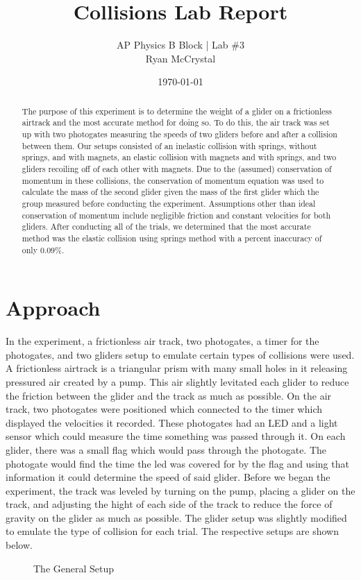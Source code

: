 \documentclass[12pt]{article}
\title{Collisions Lab Report}
\author{AP Physics B Block | Lab \#3\\Ryan McCrystal}
\date{\today}
\begin{document}
\maketitle
\newpage
\singlespacing
\tableofcontents
\doublespacing
\newpage

\begin{abstract}
	The purpose of this experiment is to determine the weight of a glider on a frictionless airtrack and the most accurate method for doing so. To do this, the air track was set up with two photogates measuring the speeds of two gliders before and after a collision between them. Our setups consisted of an inelastic collision with springs, without springs, and with magnets, an elastic collision with magnets and with springs, and two gliders recoiling off of each other with magnets. Due to the (assumed) conservation of momentum in these collisions, the conservation of momentum equation was used to calculate the mass of the second glider given the mass of the first glider which the group measured before conducting the experiment. Assumptions other than ideal conservation of momentum include negligible friction and constant velocities for both gliders. After conducting all of the trials, we determined that the most accurate method was the elastic collision using springs method with a percent inaccuracy of only $0.09\%$. %
\end{abstract}
\newpage

\section{Approach}

In the experiment, a frictionless air track, two photogates, a timer for the photogates, and two gliders setup to emulate certain types of collisions were used. A frictionless airtrack is a triangular prism with many small holes in it releasing pressured air created by a pump. This air slightly levitated each glider to reduce the friction between the glider and the track as much as possible. On the air track, two photogates were positioned which connected to the timer which displayed the velocities it recorded. These photogates had an LED and a light sensor which could measure the time something was passed through it. On each glider, there was a small flag which would pass through the photogate. The photogate would find the time the led was covered for by the flag and using that information it could determine the speed of said glider. Before we began the experiment, the track was leveled by turning on the pump, placing a glider on the track, and adjusting the hight of each side of the track to reduce the force of gravity on the glider as much as possible. The glider setup was slightly modified to emulate the type of collision for each trial. The respective setups are shown below.
\begin{figure}[H]
	\centering
	\caption{The General Setup}
\end{figure}
\end{document}
